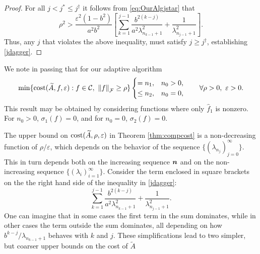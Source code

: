 \documentclass[graybox,footinfo]{svmult}
\newcommand{\DHJRnorm}[2][{}]{\ensuremath{\left \lVert #2 \right \rVert}_{#1}}
\begin{document}
\begin{proof}
For all $j < j^* \le j^\dagger$ it follows from \eqref{eq:OurAlgjstar} that
\begin{equation*}
\rho^2 > \frac{\varepsilon^2(1 - b^2)}{a^2b^2} \left[ \sum_{k=1}^{j-1} \frac{ b^{2(k-j)}}{a^{2}\lambda_{n_{k-1}+1}^2} + \frac{1}{\lambda_{n_{j-1}+1}^2}\right].
\end{equation*}
Thus, any $j$ that violates the above inequality, must satisfy $j \ge j^\dagger$, establishing \eqref{jdagger}.
\end{proof}

We note in passing that for our adaptive algorithm
\begin{equation*}
 \min \{\textup{cost}(\widetilde{A},f,\varepsilon) : f \in \calC, \ \DHJRnorm[\calF]{f} \ge \rho \} 
 \begin{cases} = n_1, & n_0 > 0, \\
 \le n_2, & n_0 = 0, 
 \end{cases}
 \qquad \forall \rho > 0, \ \varepsilon > 0.
\end{equation*}
This result may be obtained by considering functions where only $\widehat{f}_1$ is nonzero.  For $n_0 > 0$, $\sigma_1(f) = 0$, and for $n_0 = 0$, $\sigma_2(f) = 0$.

The upper bound on $\textup{cost}(\widetilde{A},\rho,\varepsilon)$ in Theorem \ref{thm:compcost}  is a non-decreasing function of $\rho/\varepsilon$, which depends on the behavior of the sequence $\{(\lambda_{n_j})_{j=0}^\infty\}$.  This in turn depends both on the increasing sequence ${\boldsymbol{n}}$ and on the non-increasing sequence $\{(\lambda_i)_{i=1}^\infty\}$. Consider the  term enclosed in square brackets on the the right hand side of the inequality in \eqref{jdagger}: \begin{equation} \label{keysum}
\sum_{k=1}^{j-1} \frac{b^{2(k-j)}}{a^2\lambda_{n_{k-1}+1}^2} + \frac{1}{\lambda_{n_{j-1}+1}^2}.
\end{equation}
One can imagine that in some cases the first term in the sum dominates, while in other cases the term outside the sum dominates, all depending on how $b^{k-j}/\lambda_{n_{k-1}+1}$ behaves with $k$ and $j$.  These simplifications lead to two simpler, but coarser upper bounds on the cost of $\widetilde{A}$
\end{document}
